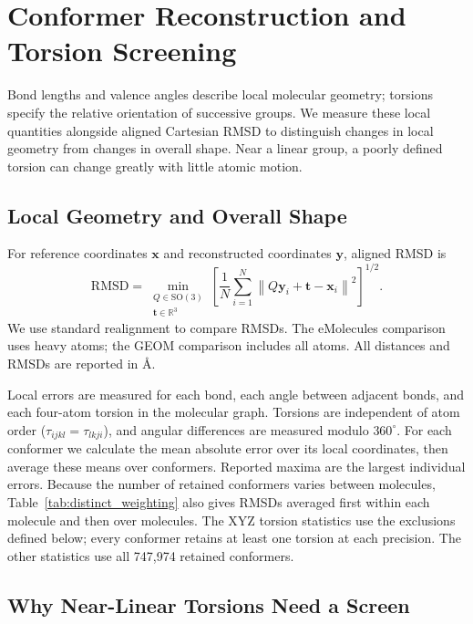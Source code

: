 \documentclass[%
 preprint,
superscriptaddress,
 amsmath,amssymb,
 aip,
 jcp,
]{revtex4-2}
\begin{document}
\section{Conformer Reconstruction and Torsion Screening}
\label{sec:reconstruction_methods}

Bond lengths and valence angles describe local molecular geometry; torsions specify the relative orientation of successive groups.
We measure these local quantities alongside aligned Cartesian RMSD to distinguish changes in local geometry from changes in overall shape.
Near a linear group, a poorly defined torsion can change greatly with little atomic motion.

\subsection{Local Geometry and Overall Shape}

For reference coordinates $\mathbf{x}$ and reconstructed coordinates $\mathbf{y}$, aligned RMSD is
\begin{equation}
    \mathrm{RMSD}=\min_{\substack{Q\in\mathrm{SO}(3)\\\mathbf{t}\in\mathbb{R}^3}}
    \left[\frac{1}{N}\sum_{i=1}^{N}
    \left\lVert Q\mathbf{y}_i+\mathbf{t}-\mathbf{x}_i\right\rVert^2\right]^{1/2}.
    \label{eq:reconstruction_rmsd}
\end{equation}
We use standard realignment to compare RMSDs.\cite{Kabsch1978ProperRotation}
The eMolecules comparison uses heavy atoms; the GEOM comparison includes all atoms.
All distances and RMSDs are reported in \AA.

Local errors are measured for each bond, each angle between adjacent bonds, and each four-atom torsion in the molecular graph.
Torsions are independent of atom order ($\tau_{i j k l} = \tau_{l k j i}$), and angular differences are measured modulo $360^\circ$.
For each conformer we calculate the mean absolute error over its local coordinates, then average these means over conformers.
Reported maxima are the largest individual errors.
Because the number of retained conformers varies between molecules, Table~\ref{tab:distinct_weighting} also gives RMSDs averaged first within each molecule and then over molecules.
The XYZ torsion statistics use the exclusions defined below; every conformer retains at least one torsion at each precision.
The other statistics use all 747,974 retained conformers.

\subsection{Why Near-Linear Torsions Need a Screen}
\end{document}
